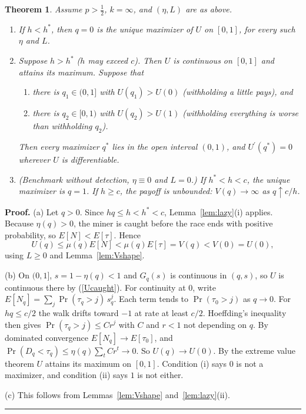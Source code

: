 \documentclass{article}%
\newtheorem{theorem}{Theorem}
\newenvironment{proof}[1][Proof]{\noindent\textbf{#1.} }{\ \rule{0.5em}{0.5em}}
\begin{document}
\begin{theorem}
\label{thm:withhold}Assume $p>\frac{1}{2}$, $k=\infty$, and $(\eta,L)$ are as
above.

\begin{enumerate}
\item[(a)] If $h<h^{\ast}$, then $q=0$ is the unique maximizer of $U$ on
$[0,1]$, for every such $\eta$ and $L$.

\item[(b)] Suppose $h>h^{\ast}$ ($h$ may exceed $c$). Then $U$ is continuous on
$[0,1]$ and attains its maximum. Suppose that

\begin{enumerate}
\item[(i)] there is $q_{1}\in(0,1]$ with $U(q_{1})>U(0)$ (withholding a little
pays), and

\item[(ii)] there is $q_{2}\in\lbrack0,1)$ with $U(q_{2})>U(1)$ (withholding
everything is worse than withholding $q_{2}$).
\end{enumerate}

Then every maximizer $q^{\ast}$ lies in the open interval $(0,1)$, and
$U^{\prime}(q^{\ast})=0$ wherever $U$ is differentiable.

\item[(c)] (Benchmark without detection, $\eta\equiv0$ and $L=0$.) If
$h^{\ast}<h<c$, the unique maximizer is $q=1$. If $h\geq c$, the payoff is
unbounded: $V(q)\rightarrow\infty$ as $q\uparrow c/h$.
\end{enumerate}
\end{theorem}

\begin{proof}
(a) Let $q>0$. Since $hq\leq h<h^{\ast}<c$, Lemma~\ref{lem:lazy}(i) applies.
Because $\eta(q)>0$, the miner is caught before the race ends with positive
probability, so $E[N]<E[\tau]$. Hence
\[
U(q)\leq\mu(q)E[N]<\mu(q)E[\tau]=V(q)<V(0)=U(0),
\]
using $L\geq0$ and Lemma~\ref{lem:Vshape}.

(b) On $(0,1]$, $s=1-\eta(q)<1$ and $G_{q}(s)$ is continuous in $(q,s)$, so
$U$ is continuous there by (\ref{Ucaught}). For continuity at $0$, write
$E[N_{q}]=\sum_{j}\Pr(\tau_{q}>j)\,s_{q}^{j}$. Each term tends to
$\Pr(\tau_{0}>j)$ as $q\rightarrow0$. For $hq\leq c/2$ the walk drifts toward
$-1$ at rate at least $c/2$. Hoeffding's inequality then gives
$\Pr(\tau_{q}>j)\leq Cr^{j}$ with $C$ and $r<1$ not depending on $q$. By
dominated convergence $E[N_{q}]\rightarrow E[\tau_{0}]$, and
$\Pr(D_{q}<\tau_{q})\leq\eta(q)\sum_{t}Cr^{t}\rightarrow0$. So
$U(q)\rightarrow U(0)$. By the extreme value theorem $U$ attains its maximum
on $[0,1]$. Condition (i) says $0$ is not a maximizer, and condition (ii) says
$1$ is not either.

(c) This follows from Lemmas~\ref{lem:Vshape} and~\ref{lem:lazy}(ii).
\end{proof}
\end{document}
